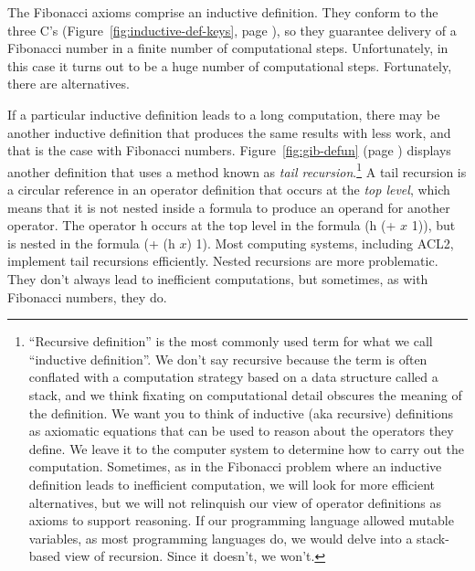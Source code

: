 The Fibonacci axioms comprise an
inductive definition.
They conform to the three C's
(Figure~\ref{fig:inductive-def-keys}, page \pageref{fig:inductive-def-keys}),
so they guarantee delivery of a Fibonacci number
in a finite number of computational steps.
Unfortunately, in this case it turns out to be
a huge number of computational steps.
Fortunately, there are alternatives.

If a particular inductive definition leads to a long computation,
there may be another inductive definition that produces the same
results with less work,
and that is the case with Fibonacci numbers.
Figure~\ref{fig:gib-defun} (page \pageref{fig:gib-defun})
displays another definition that uses a method known as
\emph{tail recursion}.\footnote{``Recursive definition''
is the most commonly used term for what we call ``inductive definition''.
We don't say recursive because the term is often conflated
with a computation strategy based on a data structure called a stack,
and we think fixating on computational detail obscures the meaning
of the definition.
We want you to think of inductive (aka recursive)
definitions as axiomatic equations that can be used to reason about the
operators they define. We leave it to the computer system
to determine how to carry out the computation.
Sometimes, as in the Fibonacci problem
where an inductive definition leads to inefficient computation,
we will look for more efficient alternatives,
but we will not relinquish our view of operator definitions
as axioms to support reasoning. If our programming language allowed
mutable variables, as most programming languages do, we would
delve into a stack-based view of recursion.
Since it doesn't, we won't.}
A tail recursion is a circular reference in an operator definition
that occurs at the
\emph{top level},
which means that it is not nested
inside a formula to produce an operand for another operator.
The operator \textsf{h} occurs at the top level
in the formula \textsf{(h (+ $x$ 1))},
but is nested in the formula \textsf{(+ (h $x$) 1)}.
Most computing systems, including ACL2,
implement tail recursions efficiently. Nested recursions are
more problematic. They don't always lead to inefficient computations,
but sometimes, as with Fibonacci numbers, they do.

